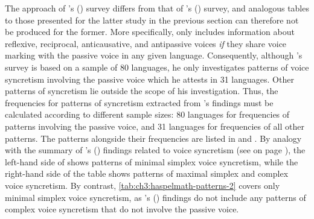 The approach of \citeauthor{haspelmath:1990}’s (\citeyear{haspelmath:1990}) survey differs from that of \citeauthor{geniusiene:1987}’s (\citeyear{geniusiene:1987}) survey, and analogous tables to those presented for the latter study in the previous section can therefore not be produced for the former. More specifically, \cite{haspelmath:1990} only includes information about reflexive, reciprocal, anticausative, and antipassive voices \textit{if} they share voice marking with the passive voice in any given language. Consequently, although \citeauthor{haspelmath:1990}’s survey is based on a sample of 80 languages, he only investigates patterns of voice syncretism involving the passive voice which he attests in 31 languages. Other patterns of syncretism lie outside the scope of his investigation. Thus, the frequencies for patterns of syncretism extracted from \citeauthor{haspelmath:1990}’s findings must be calculated according to different sample sizes: 80 languages for frequencies of patterns involving the passive voice, and 31 languages for frequencies of all other patterns. The patterns alongside their frequencies are listed in  and . By analogy with the summary of \citeauthor{geniusiene:1987}’s (\citeyear{geniusiene:1987}) findings related to voice syncretism (see  on page \pageref{tab:ch3:geniusiene-patterns}), the left-hand side of  shows patterns of minimal simplex voice syncretism, while the right-hand side of the table shows patterns of maximal simplex and complex voice syncretism. By contrast, \ref{tab:ch3:haspelmath-patterns-2} covers only minimal simplex voice syncretism, as \citeauthor{haspelmath:1990}’s (\citeyear{haspelmath:1990}) findings do not include any patterns of complex voice syncretism that do not involve the passive voice.

